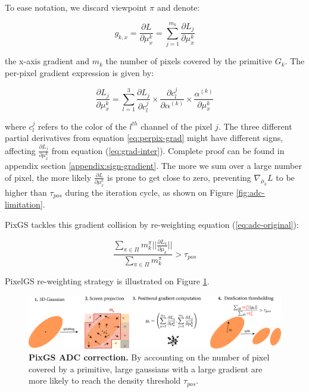 To ease notation, we discard viewpoint $\pi$ and denote: 

\begin{equation}
\label{eq:grad-inter}
    g_{k,x} = \frac{\partial L}{\partial \mu^{k}_{x}} = \sum \limits_{j=1}^{m_{k}} \frac{\partial L_{j}}{\partial \mu^{k}_{x}} 
\end{equation}

the x-axis gradient and $m_{k}$ the number of pixels covered by the primitive $G_{k}$. The per-pixel gradient expression is given by: 

\begin{equation}
\label{eq:perpix-grad}
\frac{\partial L_{j}}{\partial \mu^{k}_{x}} = \sum \limits_{l=1}^{3} \frac{\partial L_{j}}{\partial c_{l}^{j}}\times \frac{\partial c_{l}^{j}}{\partial \alpha^{(k)}} \times \frac{\alpha^{(k)}}{\partial \mu^{k}_{x} }
\end{equation}

where $c_{l}^{j}$ refers to the color of the $l^{th}$ channel of the pixel $j$. The three different partial derivatives from equation \eqref{eq:perpix-grad} might have different signs, affecting $\frac{\partial L_{j}}{\partial \mu^{k}_{x}}$ from equation (\ref{eq:grad-inter}). Complete proof can be found in appendix section \ref{appendix:sign-gradient}. The more we sum over a large number of pixel, the more likely $\frac{\partial L}{\partial \mu^{k}_{x}}$ is prone to get close to zero, preventing $\nabla_{\mu_{k}}L$ to be higher than $\tau_{pos}$ during the iteration cycle, as shown on Figure \ref{fig:adc-limitation}. 

PixGS tackles this gradient collision by re-weighting equation (\ref{eq:adc-original}): 

\begin{equation}
\frac{\sum \limits_{\pi \in \Pi} m_{k}^{\pi} ||\frac{\partial L_{\pi}}{\partial \mu_{k}}||}{\sum \limits_{\pi \in \Pi}m_{k}^{\pi}} > \tau_{pos}
\label{eq:adc-pixgs}
\end{equation}

PixelGS re-weighting strategy is illustrated on Figure \ref{fig:pixgs-adc}. 


\begin{figure}[htbp!]
    \center
  \includegraphics[width=\linewidth]{images/gaussiansplatting/pixgs_implem_improvement_NEW.png}
  \caption{\textbf{PixGS ADC correction.} By accounting on the number of pixel covered by a primitive, large gaussians with a large gradient are more likely to reach the density threshold $\tau_{pos}$.}
  \label{fig:pixgs-adc}
\end{figure}


